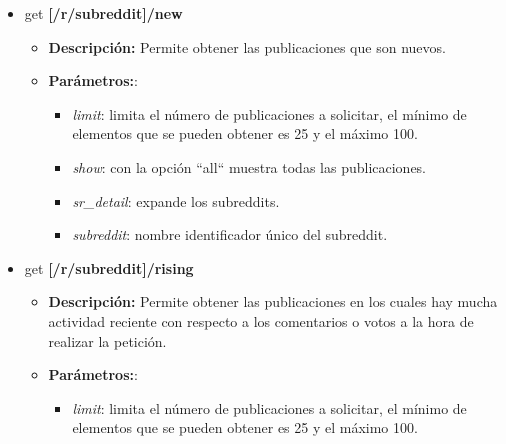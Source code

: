 \documentclass[../../main.tex]{subfiles}
\begin{document}
\begin{itemize}
\begin{itemize}
\begin{itemize}
            \item  \textit{show}: con la opción ``all`` muestra todas las publicaciones.
            
            \item  \textit{sr\_detail}: expande los \glspl{subreddit}.
            
            \item  \textit{subreddit}: nombre identificador único del \gls{subreddit}.
        \end{itemize}
    \end{itemize}
    
    \item \gls{get} \textbf{[/r/subreddit]/new}
    \begin{itemize}
        \item \textbf{Descripción:} Permite obtener las publicaciones que son nuevos.
        \item \textbf{Parámetros:}:
        \begin{itemize}
            \item  \textit{limit}: limita el número de publicaciones a solicitar, el mínimo de elementos que se pueden obtener es 25 y el máximo 100.
            
            \item  \textit{show}: con la opción ``all`` muestra todas las publicaciones.
            
            \item  \textit{sr\_detail}: expande los \glspl{subreddit}.
            
            \item  \textit{subreddit}: nombre identificador único del \gls{subreddit}.
        \end{itemize}
    \end{itemize}
    
    
    \item \gls{get} \textbf{[/r/subreddit]/rising}
    \begin{itemize}
    \item \textbf{Descripción:} Permite obtener las publicaciones en los cuales hay mucha actividad reciente con respecto a los comentarios o votos a la hora de realizar la petición.
        \item \textbf{Parámetros:}:
        \begin{itemize}
            \item  \textit{limit}: limita el número de publicaciones a solicitar, el mínimo de elementos que se pueden obtener es 25 y el máximo 100.
            

\end{itemize}
\end{itemize}
\end{itemize}
\end{document}
